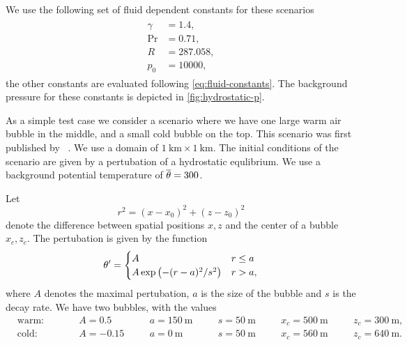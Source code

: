 We use the following set of fluid dependent constants for these scenarios
\begin{align}\label{eq:atmosphere-constants}
  \begin{split}
    \gamma &= 1.4, \\
    \Pr &=  0.71, \\
    R &= 287.058, \\
    p_0 &= 10000,
  \end{split}
\end{align}
the other constants are evaluated following \cref{eq:fluid-constants}.
The background pressure for these constants is depicted in \cref{fig:hydrostatic-p}.


As a simple test case we consider a scenario where we have one large warm air bubble in the middle, and a small cold bubble on the top.
This scenario was first published by \citeauthor{robert1993bubble}~\cite{robert1993bubble}.
We use a domain of $\SI{1}{\km} \times \SI{1}{\km}$.
The initial conditions of the scenario are given by a pertubation of a hydrostatic equlibrium.
We use a background potential temperature of $\overline{\theta} = 300$.

Let
\begin{equation}
  \label{eq:radius}
  r^2 = (x - x_0)^2 + (z - z_0)^2
\end{equation}
denote the difference between spatial positions $x,z$ and the center of a bubble $x_c, z_c$.
The pertubation is given by the function
\begin{equation}
  \label{eq:bubbles-pertubation}
  \theta' =
  \begin{cases}
    A & r \leq a \\
    A \exp \left( - (r-a)^2/s^2 \right) & r > a,
    \end{cases}
\end{equation}
where $A$ denotes the maximal pertubation, $a$ is the size of the bubble and $s$ is the decay rate.
We have two bubbles, with the values
\begin{equation}
  \label{eq:bubbles-values}
\begin{alignedat}{6}
  & \text{warm:} \qquad && A = 0.5 \quad&& a = \SI{150}{\m} \quad&& s = \SI{50}{\m} \quad&& x_c = \SI{500}{\m} \quad&& z_c = \SI{300}{\m},\\
  & \text{cold:} \qquad && A = -0.15 \quad&& a = \SI{0}{\m} \quad&& s = \SI{50}{\m} \quad&& x_c = \SI{560}{\m} \quad&& z_c = \SI{640}{\m}.
  \end{alignedat}
\end{equation}

